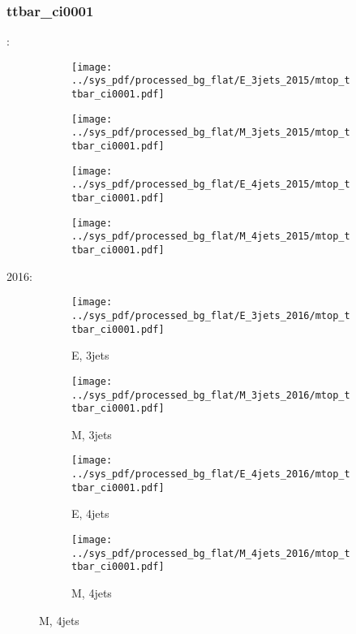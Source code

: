 \documentclass{beamer}
\begin{document}
\begin{frame}
\frametitle{ttbar_ci0001}
\fontsize{5}{1}:
\begin{figure}
\centering
\begin{subfigure}[b]{0.24\textwidth}
\texttt{[image: ../sys\_pdf/processed\_bg\_flat/E\_3jets\_2015/mtop\_ttbar\_ci0001.pdf]}
\end{subfigure}
\begin{subfigure}[b]{0.24\textwidth}
\texttt{[image: ../sys\_pdf/processed\_bg\_flat/M\_3jets\_2015/mtop\_ttbar\_ci0001.pdf]}
\end{subfigure}
\begin{subfigure}[b]{0.24\textwidth}
\texttt{[image: ../sys\_pdf/processed\_bg\_flat/E\_4jets\_2015/mtop\_ttbar\_ci0001.pdf]}
\end{subfigure}
\begin{subfigure}[b]{0.24\textwidth}
\texttt{[image: ../sys\_pdf/processed\_bg\_flat/M\_4jets\_2015/mtop\_ttbar\_ci0001.pdf]}
\end{subfigure}
\end{figure}
2016:
\begin{figure}
\centering
\begin{subfigure}[b]{0.24\textwidth}
\texttt{[image: ../sys\_pdf/processed\_bg\_flat/E\_3jets\_2016/mtop\_ttbar\_ci0001.pdf]}
\captionsetup{font=tiny}
\caption{E, 3jets}
\end{subfigure}
\begin{subfigure}[b]{0.24\textwidth}
\texttt{[image: ../sys\_pdf/processed\_bg\_flat/M\_3jets\_2016/mtop\_ttbar\_ci0001.pdf]}
\captionsetup{font=tiny}
\caption{M, 3jets}
\end{subfigure}
\begin{subfigure}[b]{0.24\textwidth}
\texttt{[image: ../sys\_pdf/processed\_bg\_flat/E\_4jets\_2016/mtop\_ttbar\_ci0001.pdf]}
\captionsetup{font=tiny}
\caption{E, 4jets}
\end{subfigure}
\begin{subfigure}[b]{0.24\textwidth}
\texttt{[image: ../sys\_pdf/processed\_bg\_flat/M\_4jets\_2016/mtop\_ttbar\_ci0001.pdf]}
\captionsetup{font=tiny}
\caption{M, 4jets}
\end{subfigure}
\end{figure}
\end{frame}
\end{document}
